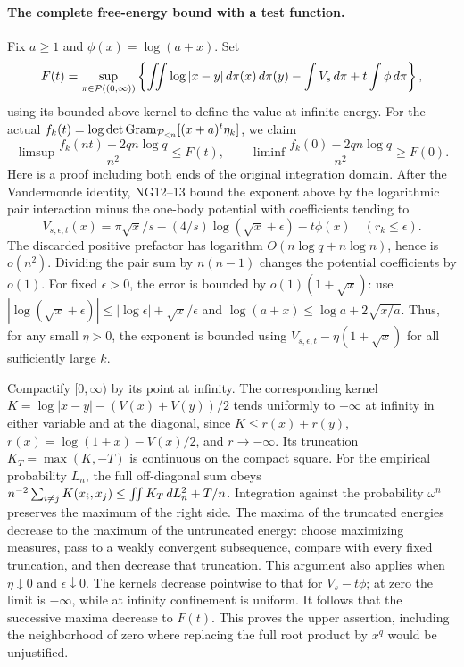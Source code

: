 \paragraph{The complete free-energy bound with a test function.}
Fix $a\ge1$ and $\phi(x)=\log(a+x)$. Set
\[
 F(t)=\sup_{\pi\in\mathcal P((0,\infty))}
 \left\{\iint\log|x-y|\,d\pi(x)\,d\pi(y)
            -\int V_s\,d\pi+t\int\phi\,d\pi\right\},
\]
using its bounded-above kernel to define the value at infinite energy.
For the actual $f_k(t)=\log\det\operatorname{Gram}_{\mathcal P_{<n}}
 [(x+a)^t\eta_k]$, we claim
\begin{equation}\tag{NG14}
 \limsup\frac{f_k(nt)-2qn\log q}{n^2}\le F(t),\qquad
 \liminf\frac{f_k(0)-2qn\log q}{n^2}\ge F(0).
\end{equation}
Here is a proof including both ends of the original integration domain.
After the Vandermonde identity, NG12--13 bound the exponent above by
the logarithmic pair interaction minus the one-body potential with
coefficients tending to
\[
 V_{s,\epsilon,t}(x)=\pi\sqrt x/s-(4/s)\log(\sqrt x+\epsilon)-t\phi(x)
 \quad(r_k\le\epsilon).
\]
The discarded positive prefactor has logarithm $O(n\log q+n\log n)$,
hence is $o(n^2)$. Dividing the pair sum by $n(n-1)$ changes the
potential coefficients by $o(1)$. For fixed $\epsilon>0$, the error
is bounded by $o(1)(1+\sqrt x)$: use
$|\log(\sqrt x+\epsilon)|\le |\log\epsilon|+\sqrt x/\epsilon$
and $\log(a+x)\le\log a+2\sqrt{x/a}$.
Thus, for any small $\eta>0$, the exponent is bounded using
$V_{s,\epsilon,t}-\eta(1+\sqrt x)$ for all sufficiently large $k$.

Compactify $[0,\infty)$ by its point at infinity. The corresponding
kernel $K=\log|x-y|-(V(x)+V(y))/2$ tends uniformly to $-\infty$ at
infinity in either variable and at the diagonal, since
$K\le r(x)+r(y)$, $r(x)=\log(1+x)-V(x)/2$, and $r\to-\infty$.
Its truncation $K_T=\max(K,-T)$ is continuous on the compact square.
For the empirical probability $L_n$, the full off-diagonal sum obeys
$n^{-2}\sum_{i\ne j}K(x_i,x_j)\le\iint K_T\,d L_n^2+T/n$.
Integration against the probability $\omega^n$ preserves the maximum
of the right side. The maxima of the truncated energies decrease to
the maximum of the untruncated energy: choose maximizing measures,
pass to a weakly convergent subsequence, compare with every fixed
truncation, and then decrease that truncation. This argument also
applies when $\eta\downarrow0$ and $\epsilon\downarrow0$.
The kernels decrease pointwise to that for $V_s-t\phi$; at zero
the limit is $-\infty$, while at infinity confinement is uniform.
It follows that the successive maxima decrease to $F(t)$.
This proves the upper assertion, including the neighborhood of zero
where replacing the full root product by $x^q$ would be unjustified.

